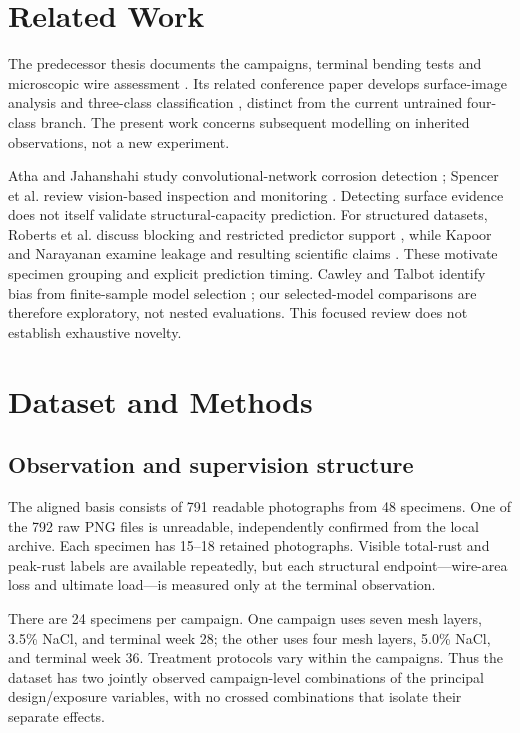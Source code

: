 \documentclass[conference]{IEEEtran}
\begin{document}
\section{Related Work}
The predecessor thesis documents the campaigns, terminal bending tests and microscopic wire assessment \cite{hossain_thesis}. Its related conference paper develops surface-image analysis and three-class classification \cite{artiste2025}, distinct from the current untrained four-class branch. The present work concerns subsequent modelling on inherited observations, not a new experiment.

Atha and Jahanshahi study convolutional-network corrosion detection \cite{atha2018}; Spencer et al. review vision-based inspection and monitoring \cite{spencer2019}. Detecting surface evidence does not itself validate structural-capacity prediction. For structured datasets, Roberts et al. discuss blocking and restricted predictor support \cite{roberts2017}, while Kapoor and Narayanan examine leakage and resulting scientific claims \cite{kapoor2023}. These motivate specimen grouping and explicit prediction timing. Cawley and Talbot identify bias from finite-sample model selection \cite{cawley2010}; our selected-model comparisons are therefore exploratory, not nested evaluations. This focused review does not establish exhaustive novelty.

\section{Dataset and Methods}
\subsection{Observation and supervision structure}
The aligned basis consists of 791 readable photographs from 48 specimens. One of the 792 raw PNG files is unreadable, independently confirmed from the local archive. Each specimen has 15--18 retained photographs. Visible total-rust and peak-rust labels are available repeatedly, but each structural endpoint---wire-area loss and ultimate load---is measured only at the terminal observation.

There are 24 specimens per campaign. One campaign uses seven mesh layers, 3.5\% NaCl, and terminal week 28; the other uses four mesh layers, 5.0\% NaCl, and terminal week 36. Treatment protocols vary within the campaigns. Thus the dataset has two jointly observed campaign-level combinations of the principal design/exposure variables, with no crossed combinations that isolate their separate effects.
\end{document}

